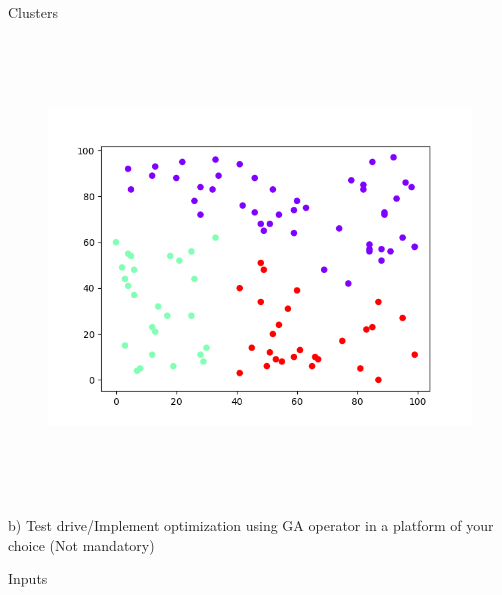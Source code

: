 \documentclass[12pt]{article}
\renewcommand{\_}{\kern-1.5pt\textunderscore\kern-1.5pt}
\begin{document}

\par

{\fontsize{14pt}{16.8pt} Clusters\par}\par




\begin{figure}[H]
	\begin{Center}
		\includegraphics[width=6.4in,height=4.8in]{./media/image18.png}
	\end{Center}
\end{figure}



\par


\vspace{\baselineskip}
{\fontsize{14pt}{16.8pt}\selectfont b) Test drive/Implement optimization using GA operator in a platform of your choice (Not mandatory)\par}\par

{\fontsize{14pt}{16.8pt}\selectfont Inputs\par}\par
\end{document}
